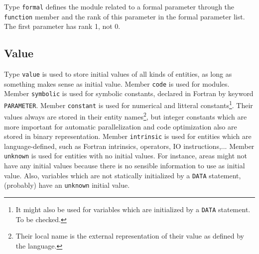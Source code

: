 \documentclass[a4paper]{article}
\begin{document}
{}

Type \texttt{formal} defines the module related to a formal parameter
through the \texttt{function} member and the rank of this parameter in the
formal parameter list. The first parameter has rank 1, not 0.

\begin{comment}
Le domaine \verb/formal/ indique le module dans lequel un param�tre formel
est d�clar� gr�ce au sous-domaine \verb/function/, et le rang de ce
param�tre dans la liste des param�tres gr�ce au sous-domaine
\verb/offset/.
Le premier param�tre a un rang de 1 et non de 0.
\end{comment}

\subsection{Value}
\label{subsection-value}

{}

Type \verb/value/ is used to store initial values of all kinds of
entities, as long as something makes sense as initial value. Member
\verb/code/ is used for modules. Member \verb/symbolic/ is used for symbolic
constants, declared in Fortran by keyword \texttt{PARAMETER}. Member 
\verb/constant/ is used for numerical and litteral constants\footnote{It might
also be used for variables which are initialized by a \texttt{DATA}
statement. To be checked.}. Their values always are stored in their
entity names\footnote{Their local name is the external representation of
their value as defined by the language.}, but integer constants which
are more important for automatic parallelization and code optimization
also are stored in binary representation. Member \texttt{intrinsic} is used
for entities which are language-defined, such as Fortran intrinsics,
operators, IO instructions,... Member \texttt{unknown} is used for entities
with no initial values. For instance, areas might not have any initial
values because there is no sensible information to use as initial
value. Also, variables which are not statically initialized by a 
\texttt{DATA} statement, (probably) have an \texttt{unknown} initial value.

\begin{comment}
Le domaine \verb/value/ permet de repr�senter les
valeurs initiales des entit�s. Le sous-domaine \verb/code/ est utilis�
pour les entit�s modules. Le sous-domaine \verb/symbolic/ est utilis�
pour les entit�s constantes symboliques. Le sous-domaine
\verb/constant/ est utilis� pour les entit�s constantes. Le
sous-domaine \verb/intrinsic/ est utilis� pour toutes les entit�s qui
ne d�pendent que du langage, telles que les intrinsics Fortran, les
op�rateurs, les instructions, etc. Enfin le sous-domaine
\verb/unknown/ est utilis� pour les valeurs initiales inconnues.
\end{comment}
\end{document}
